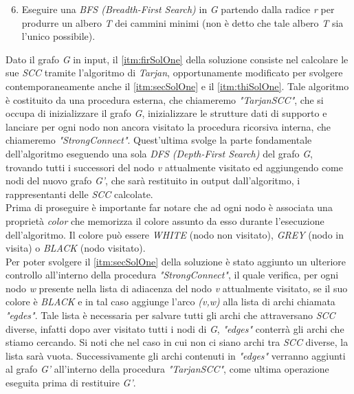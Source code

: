 \documentclass[10pt,a4paper,oneside,article,italian]{memoir}
\theoremstyle{definition}
\begin{document}
\begin{enumerate}[label=(\arabic*)]
\setcounter{enumi}{5}
\item Eseguire una \textit{BFS (Breadth-First Search)} in \textit{G} partendo dalla radice \textit{r} per produrre un albero \textit{T} dei cammini minimi (non è detto che tale albero \textit{T} sia l'unico possibile).
\end{enumerate}
Dato il grafo \textit{G} in input, il \cref{itm:firSolOne} della soluzione consiste nel calcolare le sue \textit{SCC} tramite l'algoritmo di \textit{Tarjan}, opportunamente modificato per svolgere contemporaneamente anche il \cref{itm:secSolOne} e il \cref{itm:thiSolOne}. Tale algoritmo è costituito da una procedura esterna, che chiameremo \textit{"TarjanSCC"}, che si occupa di inizializzare il grafo \textit{G}, inizializzare le strutture dati di supporto e lanciare per ogni nodo non ancora visitato la procedura ricorsiva interna, che chiameremo \textit{"StrongConnect"}. Quest'ultima svolge la parte fondamentale dell'algoritmo eseguendo una sola \textit{DFS (Depth-First Search)} del grafo \textit{G}, trovando tutti i successori del nodo \textit{v} attualmente visitato ed aggiungendo come nodi del nuovo grafo \textit{G'}, che sarà restituito in output dall'algoritmo, i rappresentanti delle \textit{SCC} calcolate.\\
Prima di proseguire è importante far notare che ad ogni nodo è associata una proprietà \textit{color} che memorizza il colore assunto da esso durante l'esecuzione dell'algoritmo. Il colore può essere \textit{WHITE} (nodo non visitato), \textit{GREY} (nodo in visita) o \textit{BLACK} (nodo visitato).\\
Per poter svolgere il \cref{itm:secSolOne} della soluzione è stato aggiunto un ulteriore controllo all'interno della procedura \textit{"StrongConnect"}, il quale verifica, per ogni nodo \textit{w} presente nella lista di adiacenza del nodo \textit{v} attualmente visitato, se il suo colore è \textit{BLACK} e in tal caso aggiunge l'arco \textit{(v,w)} alla lista di archi chiamata \textit{"egdes"}. Tale lista è necessaria per salvare tutti gli archi che attraversano \textit{SCC} diverse, infatti dopo aver visitato tutti i nodi di \textit{G}, \textit{"edges"} conterrà gli archi che stiamo cercando. Si noti che nel caso in cui non ci siano archi tra \textit{SCC} diverse, la lista sarà vuota. Successivamente gli archi contenuti in \textit{"edges"} verranno aggiunti al grafo \textit{G'} all'interno della procedura \textit{"TarjanSCC"}, come ultima operazione eseguita prima di restituire \textit{G'}.\\
\end{document}
